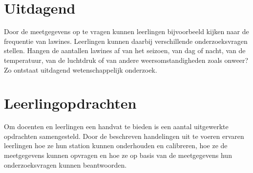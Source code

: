 \section{Uitdagend}

Door de meetgegevens op te vragen kunnen leerlingen bijvoorbeeld kijken
naar de frequentie van lawines.  Leerlingen kunnen daarbij verschillende
onderzoeksvragen stellen. Hangen de aantallen lawines af van het
seizoen, van dag of nacht, van de temperatuur, van de luchtdruk of van
andere weersomstandigheden zoals onweer? Zo ontstaat uitdagend
wetenschappelijk onderzoek. 


\section{Leerlingopdrachten}

Om docenten en leerlingen een handvat te bieden is een aantal
uitgewerkte opdrachten samengesteld. Door de beschreven handelingen uit
te voeren ervaren leerlingen hoe ze hun \hisparc station kunnen
onderhouden en calibreren, hoe ze de meetgegevens kunnen opvragen en hoe
ze op basis van de meetgegevens hun onderzoeksvragen kunnen beantwoorden.


